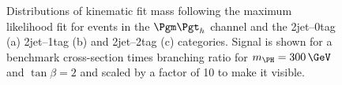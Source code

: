 \begin{figure}
\begin{center}

\end{center}
\caption[Distributions of kinematic fit mass following the maximum likelihood fit for
events in the $\mutau$ channel.]{
Distributions of kinematic fit mass following the maximum likelihood fit for
events in the $\mutau$ channel and the 2jet--0tag (a) 2jet--1tag (b) and 
2jet--2tag (c) categories. Signal is shown for a benchmark
cross-section times branching ratio for $m_{\PH}=300\,\GeV$ and $\tan\beta=2$
and scaled by a factor of 10 to make it visible.}
\label{fig:PostFitMHmutau}
\end{figure} 


